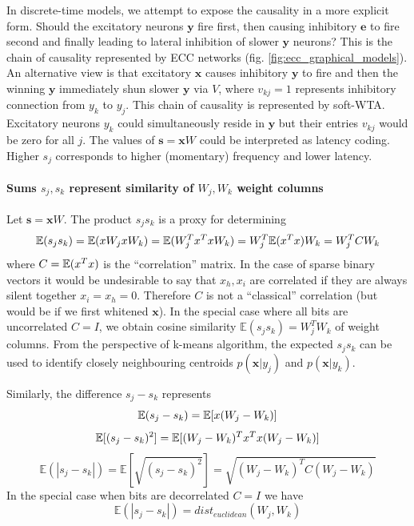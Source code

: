 \documentclass[12pt]{article}
\begin{document}
In discrete-time models, we attempt to expose the causality in a more explicit form. Should the excitatory neurons $\boldsymbol{y}$ fire first, then causing inhibitory $\boldsymbol{e}$ to fire second and finally leading to lateral inhibition of slower $\boldsymbol{y}$ neurons? This is the chain of causality represented by ECC networks (fig. \ref{fig:ecc_graphical_models}). An alternative view is that excitatory $\boldsymbol{x}$ causes inhibitory $\boldsymbol{y}$ to fire and then the winning  $\boldsymbol{y}$ immediately shun slower  $\boldsymbol{y}$ via  $V$, where $v_{kj}=1$ represents inhibitory connection from $y_k$ to $y_j$. This chain of causality is represented by soft-WTA. Excitatory neurons $y_k$ could simultaneously reside in $\boldsymbol{y}$ but their entries $v_{kj}$ would be zero for all $j$.  The values of $\boldsymbol{s}=\boldsymbol{x} W$ could be interpreted as latency coding. Higher $s_j$ corresponds to higher (momentary) frequency and lower latency.

\paragraph{Sums $s_j,s_k$ represent similarity of $W_j,W_k$ weight columns}
Let $\boldsymbol{s}=\boldsymbol{x} W$. The product $s_j s_k$ is a proxy for determining
\[
\mathbb{E}(s_j s_k) =  \mathbb{E}(\boldmath{x} W_j \boldmath{x} W_k)=  \mathbb{E}(W_j^T \boldmath{x}^T  \boldmath{x} W_k) = W_j^T \mathbb{E}(\boldmath{x}^T  \boldmath{x}) W_k = W_j^T C W_k 
\]
where $C=\mathbb{E}(\boldmath{x}^T  \boldmath{x})$ is the ``correlation'' matrix. In the case of sparse binary vectors it would be undesirable to say that $x_h,x_i$ are correlated if they are always silent together $x_i=x_h=0$. Therefore  $C$ is not a ``classical'' correlation (but would be if we first whitened $\boldsymbol{x}$). 
In the special case where all bits are uncorrelated $C=I$, we obtain cosine similarity $\mathbb{E}(s_j s_k)=W_j^TW_k$ of weight columns. From the  perspective of k-means algorithm, the expected $s_j s_k$ can be used to identify closely neighbouring centroids $p(\boldsymbol{x}|y_j)$ and $p(\boldsymbol{x}|y_k)$. 

Similarly, the difference $s_j-s_k$ represents
\[
\mathbb{E}(s_j - s_k) = \mathbb{E}[\boldmath{x} (W_j - W_k)]
\]
\[
\mathbb{E}[(s_j - s_k)^2] = \mathbb{E}[(W_j - W_k)^T \boldmath{x}^T \boldmath{x} (W_j - W_k)]
\]
\[
\mathbb{E}(|s_j - s_k|) = \mathbb{E}[\sqrt{(s_j - s_k)^2}] = 
\sqrt{(W_j - W_k)^T C (W_j - W_k)}
\]
In the special case when bits are decorrelated $C=I$ we have
\[
\mathbb{E}(|s_j - s_k|) = dist_{euclidean}(W_j,W_k)
\]
\end{document}
